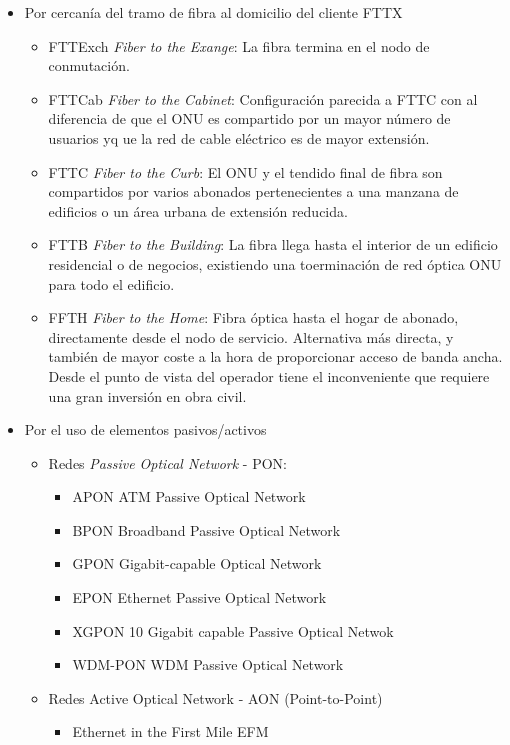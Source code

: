 \documentclass[10pt,portrait, twocolumn]{article}
\begin{document}
	\begin{itemize}
	\item Por cercanía del tramo de fibra al domicilio del cliente FTTX
	
		\begin{itemize}
			\item FTTExch \textit{Fiber to the Exange}: La fibra termina en el nodo de conmutación.
			\item FTTCab \textit{Fiber to the Cabinet}:  Configuración parecida a FTTC con al diferencia de que el ONU es compartido por un mayor número de usuarios yq ue la red de cable eléctrico es de mayor extensión.
			\item FTTC \textit{Fiber to the Curb}: El ONU y el tendido final de fibra son compartidos por varios abonados pertenecientes a una manzana de edificios o un área urbana de extensión reducida.
			\item FTTB \textit{Fiber to the Building}: La fibra llega hasta el interior de un edificio residencial o de negocios,  existiendo una toerminación de red óptica ONU para todo el edificio.
			\item FFTH \textit{Fiber to the Home}: Fibra óptica hasta el hogar de abonado, directamente desde el nodo de servicio. Alternativa más directa, y también de mayor coste a la hora de proporcionar acceso de banda ancha. Desde el punto de vista del operador tiene el inconveniente que requiere una gran inversión en obra civil.

		\end{itemize}
		
	\item Por el uso de elementos pasivos/activos
	
		\begin{itemize}
		\item Redes \textit{Passive Optical Network} - PON:
			\begin{itemize}
			\item APON ATM Passive Optical Network
			\item BPON Broadband Passive Optical Network
			\item GPON Gigabit-capable Optical Network
			\item EPON Ethernet Passive Optical Network
			\item XGPON 10 Gigabit capable Passive Optical Netwok
			\item WDM-PON WDM Passive Optical Network
			\end{itemize}
		\item Redes Active Optical Network - AON (Point-to-Point)
			\begin{itemize}
			\item Ethernet in the First Mile EFM
			\end{itemize}
		\end{itemize}
	\end{itemize}
\end{document}
